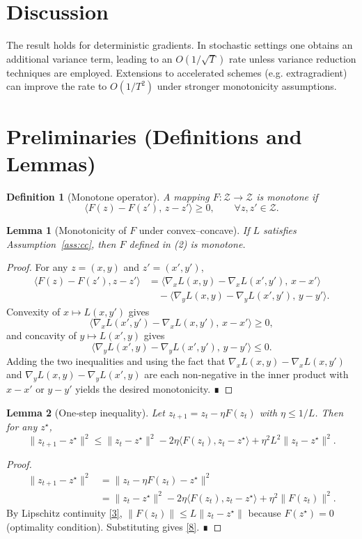 \documentclass{article}
\newtheorem{lemma}{Lemma}
\newtheorem{definition}{Definition}
\begin{document}
\section*{Discussion}
The result holds for deterministic gradients. In stochastic settings one obtains an
additional variance term, leading to an $O(1/\sqrt{T})$ rate unless variance reduction
techniques are employed. Extensions to accelerated schemes (e.g. extragradient)
can improve the rate to $O(1/T^{2})$ under stronger monotonicity assumptions.

\newpage

\section*{Preliminaries (Definitions and Lemmas)}

\begin{definition}[Monotone operator]
A mapping $F:\mathcal Z\to\mathcal Z$ is monotone if
\[
\langle F(z)-F(z'),\,z-z'\rangle\ge0,\qquad\forall z,z'\in\mathcal Z .
\tag{7}
\]
\end{definition}

\begin{lemma}[Monotonicity of $F$ under convex–concave]\label{lem:monotone}
If $L$ satisfies Assumption~\ref{ass:cc}, then $F$ defined in (2) is monotone.
\end{lemma}
\begin{proof}
For any $z=(x,y)$ and $z'=(x',y')$,
\[
\begin{aligned}
\langle F(z)-F(z'),z-z'\rangle
&=\langle\nabla_{x}L(x,y)-\nabla_{x}L(x',y'),\,x-x'\rangle\\
&\quad-\langle\nabla_{y}L(x,y)-\nabla_{y}L(x',y'),\,y-y'\rangle .
\end{aligned}
\]
Convexity of $x\mapsto L(x,y')$ gives
\[
\langle\nabla_{x}L(x',y')-\nabla_{x}L(x,y'),\,x-x'\rangle\ge0,
\]
and concavity of $y\mapsto L(x',y)$ gives
\[
\langle\nabla_{y}L(x',y)-\nabla_{y}L(x',y'),\,y-y'\rangle\le0.
\]
Adding the two inequalities and using the fact that
$\nabla_{x}L(x,y)-\nabla_{x}L(x,y')$ and
$\nabla_{y}L(x,y)-\nabla_{y}L(x',y)$ are each non‑negative in the inner product with
$x-x'$ or $y-y'$ yields the desired monotonicity. ∎
\end{proof}

\begin{lemma}[One‑step inequality]\label{lem:one-step}
Let $z_{t+1}=z_{t}-\eta F(z_{t})$ with $\eta\le1/L$. Then for any $z^{\star}$,
\[
\|z_{t+1}-z^{\star}\|^{2}
\le
\|z_{t}-z^{\star}\|^{2}
-2\eta\langle F(z_{t}),z_{t}-z^{\star}\rangle
+\eta^{2}L^{2}\|z_{t}-z^{\star}\|^{2}.
\tag{8}
\]
\end{lemma}
\begin{proof}
\[
\begin{aligned}
\|z_{t+1}-z^{\star}\|^{2}
&=\|z_{t}-\eta F(z_{t})-z^{\star}\|^{2}\\
&=\|z_{t}-z^{\star}\|^{2}
-2\eta\langle F(z_{t}),z_{t}-z^{\star}\rangle
+\eta^{2}\|F(z_{t})\|^{2}.
\end{aligned}
\]
By Lipschitz continuity \eqref{3},
$\|F(z_{t})\|\le L\|z_{t}-z^{\star}\|$ because $F(z^{\star})=0$ (optimality condition). Substituting
gives \eqref{8}. ∎
\end{proof}
\end{document}
